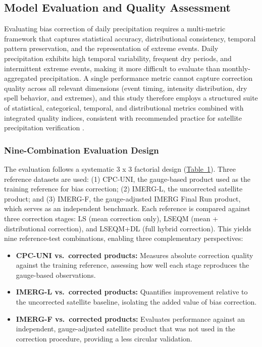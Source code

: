 \documentclass[11pt,a4paper]{article}
\providecommand{\tightlist}{\setlength{\itemsep}{0pt}\setlength{\parskip}{0pt}}
\begin{document}
\subsection{Model Evaluation and Quality
Assessment}\label{model-evaluation-and-quality-assessment}

Evaluating bias correction of daily precipitation requires a
multi-metric framework that captures statistical accuracy,
distributional consistency, temporal pattern preservation, and the
representation of extreme events. Daily precipitation exhibits high
temporal variability, frequent dry periods, and intermittent extreme
events, making it more difficult to evaluate than monthly-aggregated
precipitation. A single performance metric cannot capture correction
quality across all relevant dimensions (event timing, intensity
distribution, dry spell behavior, and extremes), and this study
therefore employs a structured suite of statistical, categorical,
temporal, and distributional metrics combined with integrated quality
indices, consistent with recommended practice for satellite
precipitation verification \cite{ref14,ref15}.

\subsubsection{Nine-Combination Evaluation Design}\label{nine-combination-evaluation-design}

The evaluation follows a systematic 3 x 3 factorial design (\hyperref[tab:1]{Table~1}).
Three reference datasets are used: (1) CPC-UNI, the gauge-based product
used as the training reference for bias correction; (2) IMERG-L, the
uncorrected satellite product; and (3) IMERG-F, the gauge-adjusted IMERG
Final Run product, which serves as an independent benchmark. Each
reference is compared against three correction stages: LS (mean
correction only), LSEQM (mean + distributional correction), and LSEQM+DL
(full hybrid correction). This yields nine reference-test combinations,
enabling three complementary perspectives:

\begin{itemize}
\tightlist
\item
  \textbf{CPC-UNI vs.~corrected products:} Measures absolute correction
  quality against the training reference, assessing how well each stage
  reproduces the gauge-based observations.
\item
  \textbf{IMERG-L vs.~corrected products:} Quantifies improvement
  relative to the uncorrected satellite baseline, isolating the added
  value of bias correction.
\item
  \textbf{IMERG-F vs.~corrected products:} Evaluates performance against
  an independent, gauge-adjusted satellite product that was not used in
  the correction procedure, providing a less circular validation.
\end{itemize}
\end{document}
